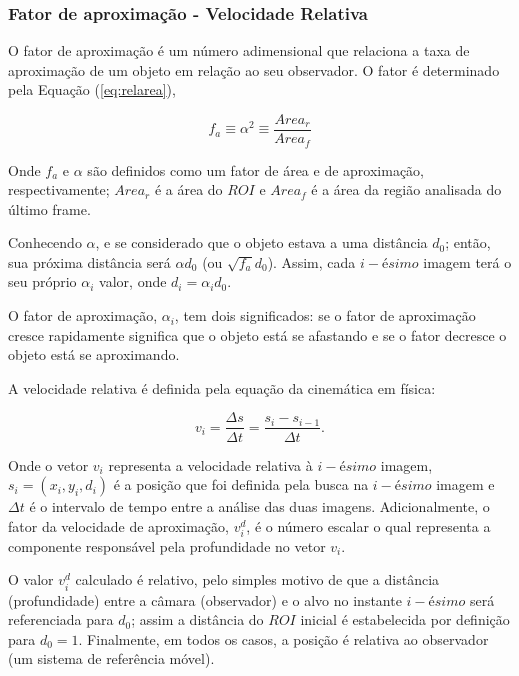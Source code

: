 \subsubsection{Fator de aproximação - Velocidade Relativa}

O fator de aproximação é um número adimensional que relaciona a taxa de 
aproximação de um objeto em relação ao seu observador.
O fator é determinado pela Equação (\ref{eq:relarea}),

\begin{equation}\label{eq:relarea}
f_a \equiv \alpha^2 \equiv \frac{Area_r}{Area_f} 
\end{equation}

Onde $f_a$ e $\alpha$ são definidos como um fator de área e de aproximação,
respectivamente; $Area_r$ é a área do $ROI$ e $Area_f$ é a área da região analisada
do último frame.

Conhecendo $\alpha$, e se considerado que o objeto estava a uma distância $d_0$; então,
sua próxima distância será $\alpha d_0$ (ou $\sqrt{f_a} d_0$). Assim, cada $i-ésimo$ imagem
terá o seu próprio $\alpha_i$ valor, onde $d_i=\alpha_i d_0$.

O fator de aproximação, $\alpha_i$, tem dois significados: se o fator de aproximação cresce rapidamente 
significa que o objeto está se afastando e se o fator decresce o objeto está se aproximando.

A velocidade relativa é definida pela equação da cinemática em física:

\begin{equation}
 v_i = \frac{\Delta s}{\Delta t}= \frac{s_i-s_{i-1}}{\Delta t}.
\end{equation}

Onde o vetor $v_i$ representa a velocidade relativa à $i-ésimo$ imagem, $s_i=(x_i,y_i,d_i)$ é a posição que
foi definida pela busca na $i-ésimo$ imagem e $\Delta t$ é o intervalo de tempo entre a análise das duas imagens.
Adicionalmente, o fator da velocidade de aproximação, $v^d_i$, é o número escalar o qual representa a componente
responsável pela profundidade no vetor $v_i$.

O valor $v^d_i$ calculado é relativo, pelo simples motivo de que a distância (profundidade) entre a câmara 
(observador) e o alvo no instante $i-ésimo$ será referenciada para $d_0$; assim a distância do $ROI$ 
inicial é estabelecida por definição para $d_0=1$. Finalmente, em todos os casos, a posição é 
relativa ao observador (um sistema de referência móvel).

